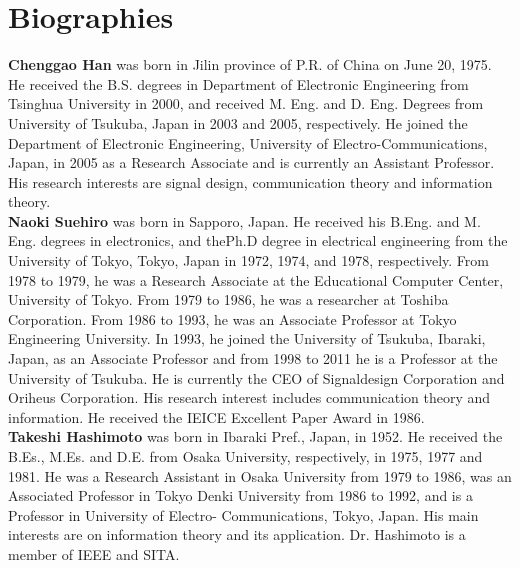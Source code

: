 


\section*{Biographies}
\textbf{Chenggao Han} was born in Jilin province of P.R. of China on June 20, 1975. He received the B.S. degrees in Department of Electronic Engineering from Tsinghua University in 2000, and received M. Eng. and D. Eng. Degrees from University of Tsukuba, Japan in 2003 and 2005, respectively. He joined the Department of Electronic Engineering, University of Electro-Communications, Japan, in 2005 as a Research Associate and is currently an Assistant Professor. His research interests are signal design, communication theory and information theory.\\[6pt]

\textbf{Naoki Suehiro} was born in Sapporo, Japan. He received his B.Eng. and M. Eng. degrees in electronics, and thePh.D degree in electrical engineering from the University of Tokyo, Tokyo, Japan in 1972, 1974, and 1978, respectively. From 1978 to 1979, he was a Research Associate at the Educational Computer Center, University of Tokyo. From 1979 to 1986, he was a researcher at Toshiba Corporation. From 1986 to 1993, he was an Associate Professor at Tokyo Engineering University. In 1993, he joined the University of Tsukuba, Ibaraki, Japan, as an Associate Professor and from 1998 to 2011 he is a Professor at the University of Tsukuba. He is currently the CEO of Signaldesign Corporation and Oriheus Corporation. His research interest includes communication theory and information. He received the IEICE Excellent Paper Award in 1986.\\[6pt]

\textbf{Takeshi Hashimoto} was born in Ibaraki Pref., Japan, in 1952. He received the B.Es., M.Es. and D.E. from Osaka University, respectively, in 1975, 1977 and 1981. He was a Research Assistant in Osaka University from 1979 to 1986, was an Associated Professor in Tokyo Denki University from 1986 to 1992, and is a Professor in University of Electro- Communications, Tokyo, Japan. His main interests are on information theory and its application. Dr. Hashimoto is a member of IEEE and SITA.